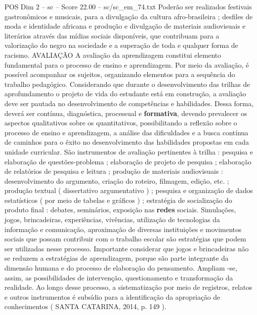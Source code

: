 \begin{textsample}{POS Dim 2 – sc – Score 22.00 – sc/sc\_em\_74.txt}
Poderão ser realizados festivais gastronômicos e musicais, para a divulgação da cultura afro-brasileira ; desfiles de moda e identidade africana e produção e divulgação de materiais audiovisuais e literários através das mídias sociais disponíveis, que contribuam para a valorização do negro na sociedade e a superação de toda e qualquer forma de racismo.
AVALIAÇÃO A avaliação da aprendizagem constitui elemento fundamental para o processo de ensino e aprendizagem.
Por meio da avaliação, é possível acompanhar os sujeitos, organizando elementos para a sequência do trabalho pedagógico.
Considerando que durante o desenvolvimento das trilhas de aprofundamento o projeto de vida do estudante está em construção, a avaliação deve ser pautada no desenvolvimento de competências e habilidades.
Dessa forma, deverá ser contínua, diagnóstica, processual e \textbf{formativa}, devendo prevalecer os aspectos qualitativos sobre os quantitativos, possibilitando a reflexão sobre o processo de ensino e aprendizagem, a análise das dificuldades e a busca contínua de caminhos para o êxito no desenvolvimento das habilidades propostas em cada unidade curricular.
São instrumentos de avaliação pertinentes à trilha : pesquisa e elaboração de questões-problema ; elaboração de projeto de pesquisa ; elaboração de relatórios de pesquisa e leitura ; produção de materiais audiovisuais : desenvolvimento do argumento, criação do roteiro, filmagem, edição, etc. ; produção textual ( dissertativo argumentativo ) ; pesquisa e organização de dados estatísticos ( por meio de tabelas e gráficos ) ; estratégia de socialização do produto final : debates, seminários, exposição nas \textbf{redes} sociais.
Simulações, jogos, brincadeiras, experiências, vivências, utilização de tecnologias da informação e comunicação, aproximação de diversas instituições e movimentos sociais que possam contribuir com o trabalho escolar são estratégias que podem ser utilizadas nesse processo.
Importante considerar que jogos e brincadeiras não se reduzem a estratégias de aprendizagem, porque são parte integrante da dimensão humana e do processo de elaboração do pensamento.
Ampliam -se, assim, as possibilidades de intervenção, questionamento e transformação da realidade.
Ao longo desse processo, a sistematização por meio de registros, relatos e outros instrumentos é subsídio para a identificação da apropriação de conhecimentos ( SANTA CATARINA, 2014, p. 149 ).

\end{textsample}
